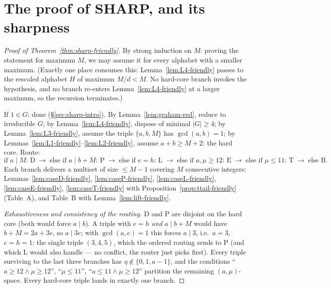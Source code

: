 \documentclass[11pt,reqno]{amsart}
\theoremstyle{plain}
\theoremstyle{definition}
\theoremstyle{remark}
\begin{document}

\section{The proof of SHARP, and its sharpness}\label{sec:sharp-assembly}

\begin{proof}[Proof of Theorem~\ref{thm:sharp-friendly}]
By strong induction on $M$: proving the statement for maximum $M$, we may assume
it for every alphabet with a smaller maximum. (Exactly one place consumes this:
Lemma~\ref{lem:L4-friendly} passes to the rescaled alphabet $H$ of maximum $M/d <
M$. No hard-core branch invokes the hypothesis, and no branch re-enters
Lemma~\ref{lem:L4-friendly} at a larger maximum, so the recursion terminates.)

If $1 \in G$: done (\S\ref{sec:sharp-intro}). By
Lemma~\ref{lem:graham-red}, reduce to irreducible $G$; by
Lemma~\ref{lem:L4-friendly}, dispose of minimal $|G| \ge 4$; by
Lemma~\ref{lem:L3-friendly}, assume the triple $\{a,b,M\}$ has $\gcd(a,b) = 1$;
by Lemmas~\ref{lem:L1-friendly}--\ref{lem:L2-friendly}, assume $a + b \ge M + 2$:
the hard core. Route:
\[
  \text{if } a \mid M \text{: D} \;\to\;
  \text{else if } a \mid b{+}M \text{: P} \;\to\;
  \text{else if } e = h \text{: L} \;\to\;
  \text{else if } a, \mu \ge 12 \text{: E} \;\to\;
  \text{else if } \mu \le 11 \text{: T} \;\to\;
  \text{else B.}
\]
Each branch delivers a multiset of size $\le M - 1$ covering $M$ consecutive
integers: Lemmas~\ref{lem:caseD-friendly}, \ref{lem:caseP-friendly},
\ref{lem:caseL-friendly}, \ref{lem:caseE-friendly}, \ref{lem:caseT-friendly}
with Proposition~\ref{prop:ttail-friendly} (Table~A), and
Table~B with Lemma~\ref{lem:lift-friendly}.

\emph{Exhaustiveness and consistency of the routing.} D and P are disjoint on
the hard core (both would force $a \mid b$). A triple with $e = h$ \emph{and}
$a \mid b + M$ would have $b + M = 2a + 3e$, so $a \mid 3e$; with $\gcd(a, e) =
1$ this forces $a \mid 3$, i.e.\ $a = 3$, $e = h = 1$: the single triple $(3, 4,
5)$, which the ordered routing sends to P (and which L would also handle --- no
conflict, the router just picks first). Every triple surviving to the last three
branches has $\eta \notin \{0, 1, a-1\}$, and the conditions ``$a \ge 12 \wedge
\mu \ge 12$'', ``$\mu \le 11$'', ``$a \le 11 \wedge \mu \ge 12$'' partition the
remaining $(a, \mu)$-space. Every hard-core triple lands in exactly one branch.
\end{proof}
\end{document}
